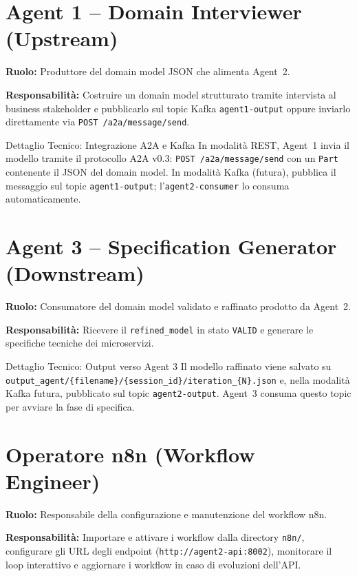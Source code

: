 \documentclass[12pt,a4paper]{report}
\begin{document}
\section{Agent 1 -- Domain Interviewer (Upstream)}

\textbf{Ruolo:} Produttore del domain model JSON che alimenta Agent~2.

\textbf{Responsabilità:} Costruire un domain model strutturato tramite intervista
al business stakeholder e pubblicarlo sul topic Kafka \texttt{agent1-output}
oppure inviarlo direttamente via \texttt{POST /a2a/message/send}.

\begin{technicalbox}{Dettaglio Tecnico: Integrazione A2A e Kafka}
In modalità REST, Agent~1 invia il modello tramite il protocollo A2A v0.3:
\texttt{POST /a2a/message/send} con un \texttt{Part} contenente il JSON del
domain model. In modalità Kafka (futura), pubblica il messaggio sul topic
\texttt{agent1-output}; l'\texttt{agent2-consumer} lo consuma automaticamente.
\end{technicalbox}

\section{Agent 3 -- Specification Generator (Downstream)}

\textbf{Ruolo:} Consumatore del domain model validato e raffinato prodotto da Agent~2.

\textbf{Responsabilità:} Ricevere il \texttt{refined\_model} in stato \texttt{VALID}
e generare le specifiche tecniche dei microservizi.

\begin{technicalbox}{Dettaglio Tecnico: Output verso Agent 3}
Il modello raffinato viene salvato su \texttt{output\_agent/\{filename\}/\{session\_id\}/iteration\_\{N\}.json}
e, nella modalità Kafka futura, pubblicato sul topic \texttt{agent2-output}.
Agent~3 consuma questo topic per avviare la fase di specifica.
\end{technicalbox}

\section{Operatore n8n (Workflow Engineer)}

\textbf{Ruolo:} Responsabile della configurazione e manutenzione del workflow n8n.

\textbf{Responsabilità:} Importare e attivare i workflow dalla directory \texttt{n8n/},
configurare gli URL degli endpoint (\texttt{http://agent2-api:8002}), monitorare
il loop interattivo e aggiornare i workflow in caso di evoluzioni dell'API.
\end{document}
